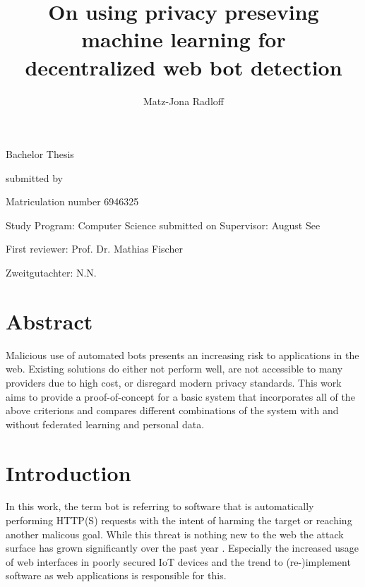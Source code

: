 \documentclass[
    fontsize=12pt,
    headings=small,
    parskip=half,           %
    bibliography=totoc,
    numbers=noenddot,       %
    open=any,               %
    final                   %
]{scrreprt}
\begin{document}
\title{On using privacy preseving machine learning for\\decentralized web bot detection}
\author{Matz-Jona Radloff}


\begin{titlepage}
\begin{center}\Large
	\vfill
    Bachelor Thesis
	\vfill
	\makeatletter
	{\Large\textsf{\textbf{\@title}}\par}
	\makeatother
	\vfill
    submitted by
	\par\bigskip
	\makeatletter
	{\@author} \par
	\makeatother
	Matriculation number 6946325 \par
	Study Program: Computer Science
	\vfill
	\makeatletter
	submitted on {\@date}
	\makeatother
	\vfill
	Supervisor: August See\par
	First reviewer: Prof. Dr. Mathias Fischer \par
	Zweitgutachter: N.N.
\end{center}
\end{titlepage}


\chapter*{Abstract}

Malicious use of automated bots presents an increasing risk to applications in the web. Existing solutions do either not perform well, are not accessible to many providers due to high cost, or disregard modern privacy standards. This work aims to provide a proof-of-concept for a basic system that incorporates all of the above criterions and compares different combinations of the system with and without federated learning and personal data.

\tableofcontents

\chapter{Introduction}

In this work, the term bot is referring to software that is automatically performing HTTP(S) requests with the intent of harming the target or reaching another malicous goal. While this threat is nothing new to the web the attack surface has grown significantly over the past year \cite{BAD_BOT_REPORT2020,BAD_BOT_REPORT2021}. Especially the increased usage of web interfaces in poorly secured IoT devices and the trend to (re-)implement software as web applications is responsible for this.
\end{document}
